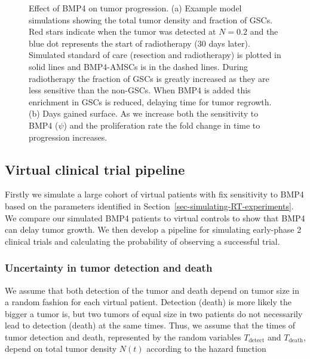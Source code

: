 \documentclass[
  default,
]{sn-jnl}
\begin{document}
\begin{figure}
\begin{minipage}{0.50\linewidth}
{}

\subcaption{\label{fig-days_gained}}

\end{minipage}%

\caption{\label{fig-effect_BMP4}Effect of BMP4 on tumor progression. (a)
Example model simulations showing the total tumor density and fraction
of GSCs. Red stars indicate when the tumor was detected at \(N=0.2\) and
the blue dot represents the start of radiotherapy (30 days later).
Simulated standard of care (resection and radiotherapy) is plotted in
solid lines and BMP4-AMSCs is in the dashed lines. During radiotherapy
the fraction of GSCs is greatly increased as they are less sensitive
than the non-GSCs. When BMP4 is added this enrichment in GSCs is
reduced, delaying time for tumor regrowth. (b) Days gained surface. As
we increase both the sensitivity to BMP4 (\(\psi\)) and the
proliferation rate the fold change in time to progression increases.}

\end{figure}%

\subsection{Virtual clinical trial
pipeline}\label{sec-virtual-trial-pipeline}

Firstly we simulate a large cohort of virtual patients with fix
sensitivity to BMP4 based on the parameters identified in
Section~\ref{sec-simulating-RT-experiments}. We compare our simulated
BMP4 patients to virtual controls to show that BMP4 can delay tumor
growth. We then develop a pipeline for simulating early-phase 2 clinical
trials and calculating the probability of observing a successful trial.

\subsubsection{Uncertainty in tumor detection and
death}\label{sec-unce-death-detect}

We assume that both detection of the tumor and death depend on tumor
size in a random fashion for each virtual patient. Detection (death) is
more likely the bigger a tumor is, but two tumors of equal size in two
patients do not necessarily lead to detection (death) at the same times.
Thus, we assume that the times of tumor detection and death, represented
by the random variables \(T_{\text{detect}}\) and \(T_{\text{death}}\),
depend on total tumor density \(N(t)\) according to the hazard function
\end{document}
